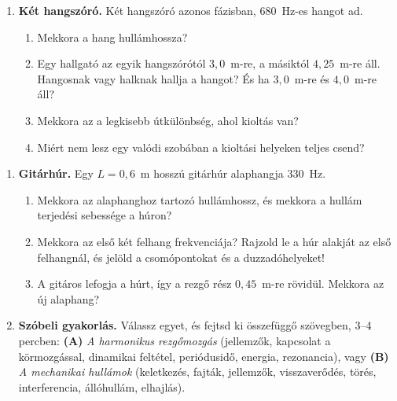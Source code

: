 \documentclass[12pt]{article}
\begin{document}
\begin{minipage}[t]{0.62\linewidth}\vspace{0pt}
\begin{enumerate}[start=6]
\item \textbf{Két hangszóró.} Két hangszóró azonos fázisban, $680$~Hz-es hangot ad.
  \begin{enumerate}
    \item Mekkora a hang hullámhossza?
    \item Egy hallgató az egyik hangszórótól $3{,}0$~m-re, a másiktól $4{,}25$~m-re áll.
      Hangosnak vagy halknak hallja a hangot? És ha $3{,}0$~m-re és $4{,}0$~m-re áll?
    \item Mekkora az a legkisebb útkülönbség, ahol kioltás van?
    \item Miért nem lesz egy valódi szobában a kioltási helyeken teljes csend?
  \end{enumerate}
\end{enumerate}
\end{minipage}\hfill
\begin{minipage}[t]{0.35\linewidth}\vspace{0pt}\centering
{}
\end{minipage}

\vspace{4pt}
\begin{enumerate}[start=7]
\item \textbf{Gitárhúr.} Egy $L = 0{,}6$~m hosszú gitárhúr alaphangja $330$~Hz.
  \begin{enumerate}
    \item Mekkora az alaphanghoz tartozó hullámhossz, és mekkora a hullám terjedési
      sebessége a húron?
    \item Mekkora az első két felhang frekvenciája? Rajzold le a húr alakját az első
      felhangnál, és jelöld a csomópontokat és a duzzadóhelyeket!
    \item A gitáros lefogja a húrt, így a rezgő rész $0{,}45$~m-re rövidül. Mekkora az új
      alaphang?
  \end{enumerate}

\item \textbf{Szóbeli gyakorlás.} Válassz egyet, és fejtsd ki összefüggő szövegben, 3--4
  percben: \textbf{(A)} \emph{A harmonikus rezgőmozgás} (jellemzők, kapcsolat a
  körmozgással, dinamikai feltétel, periódusidő, energia, rezonancia), vagy
  \textbf{(B)} \emph{A mechanikai hullámok} (keletkezés, fajták, jellemzők,
  visszaverődés, törés, interferencia, állóhullám, elhajlás).
\end{enumerate}
\end{document}
